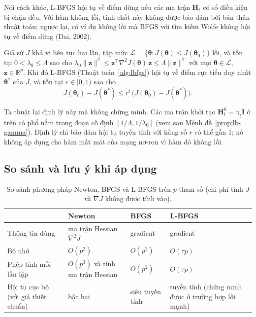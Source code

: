 Nói cách khác, L-BFGS hội tụ về điểm dừng nếu các ma trận $\mathbf{H}_t$ có số điều kiện bị chặn đều. Với hàm không lồi, tính chất này không được bảo đảm bởi bản thân thuật toán; ngược lại, có ví dụ không lồi mà BFGS với tìm kiếm Wolfe không hội tụ về điểm dừng (Dai, 2002).

\begin{theorem}\label{thm:lb-linear}
Giả sử $J$ khả vi liên tục hai lần, tập mức $\mathcal{L}=\{\boldsymbol{\theta}:J(\boldsymbol{\theta})\le J(\boldsymbol{\theta}_0)\}$ lồi, và tồn tại $0<\lambda_0\le\Lambda$ sao cho $\lambda_0\|\mathbf{z}\|^2\le\mathbf{z}^{\top}\nabla^2J(\boldsymbol{\theta})\,\mathbf{z}\le\Lambda\|\mathbf{z}\|^2$ với mọi $\boldsymbol{\theta}\in\mathcal{L}$, $\mathbf{z}\in\mathbb{R}^{p}$. Khi đó L-BFGS (Thuật toán~\ref{alg:lbfgs}) hội tụ về điểm cực tiểu duy nhất $\boldsymbol{\theta}^{*}$ của $J$, và tồn tại $r\in[0,1)$ sao cho
\begin{equation*}
  J(\boldsymbol{\theta}_t)-J(\boldsymbol{\theta}^{*})\le r^{t}\,\big(J(\boldsymbol{\theta}_0)-J(\boldsymbol{\theta}^{*})\big).
\end{equation*}
\end{theorem}

Ta thuật lại định lý này mà không chứng minh. Các ma trận khởi tạo $\mathbf{H}_t^{0}=\gamma_t\mathbf{I}$ ở trên có phổ nằm trong đoạn cố định $[1/\Lambda,1/\lambda_0]$ (xem sau Mệnh đề~\ref{prop:lb-gamma}). Định lý chỉ bảo đảm hội tụ tuyến tính với hằng số $r$ có thể gần $1$; nó không áp dụng cho hàm mất mát của mạng nơ-ron vì hàm đó không lồi.

\subsection{So sánh và lưu ý khi áp dụng}

\begin{table}[t]
\centering
\small
\caption{So sánh phương pháp Newton, BFGS và L-BFGS trên $p$ tham số (chi phí tính $J$ và $\nabla J$ không được tính vào).}\label{tab:lb-compare}
\begin{tabular}{|p{}|p{}|p{}|p{}|}
\hline
 & Newton & BFGS & L-BFGS \\ \hline
Thông tin dùng & ma trận Hessian $\nabla^2J$ & gradient & gradient \\ \hline
Bộ nhớ & $O(p^2)$ & $O(p^2)$ & $O(\tau p)$ \\ \hline
Phép tính mỗi lần lặp & $O(p^3)$ và tính ma trận Hessian & $O(p^2)$ & $O(\tau p)$ \\ \hline
Hội tụ cục bộ (với giả thiết chuẩn) & bậc hai & siêu tuyến tính & tuyến tính (chứng minh được ở trường hợp lồi mạnh) \\ \hline
\end{tabular}
\end{table}

